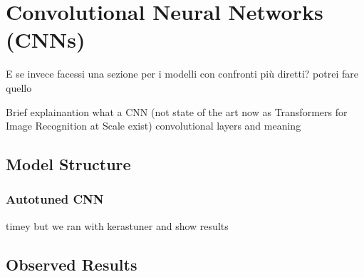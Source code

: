 \section{Convolutional Neural Networks (CNNs)}
\commentline E se invece facessi una sezione per i modelli con confronti più diretti?
potrei fare quello

Brief explainantion what a CNN (not state of the art now as Transformers for Image Recognition at Scale exist)
convolutional layers and meaning

\subsection{Model Structure}

\subsubsection{Autotuned CNN}
timey but we ran with kerastuner and show results

\subsection{Observed Results}

